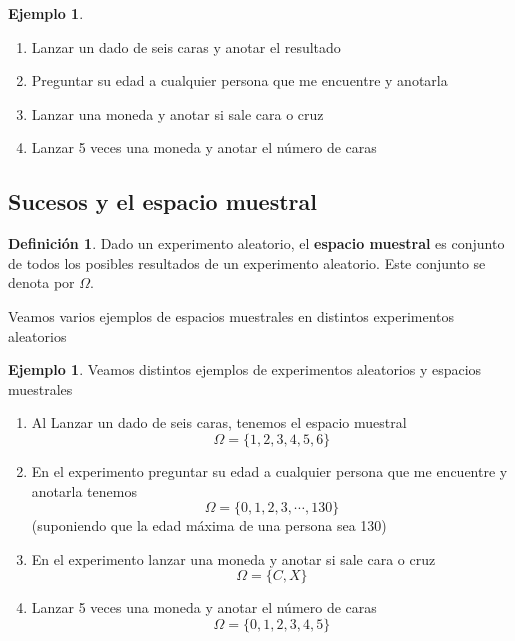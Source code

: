 \documentclass[]{book}
\theoremstyle{plain}
\theoremstyle{definition}
\newtheorem{definition}[theorem]{Definición}
\newtheorem{example}[theorem]{Ejemplo}
\theoremstyle{definition} %
\begin{document}
\begin{example}
\begin{enumerate}
    \item Lanzar un dado de seis caras y anotar el resultado
    \item Preguntar su edad a cualquier persona que me encuentre y anotarla
    \item Lanzar una moneda y anotar si sale cara o cruz
    \item Lanzar 5 veces una moneda y anotar el número de caras
\end{enumerate}
\end{example}


\subsection*{Sucesos y el espacio muestral}

\begin{definition}
   Dado un experimento aleatorio, el \textbf{espacio muestral}  es 
   conjunto de todos los posibles resultados de un experimento aleatorio. Este conjunto se denota 
   por $\Omega$.
\end{definition}
Veamos varios ejemplos de espacios muestrales en distintos experimentos aleatorios
\begin{example}
  Veamos distintos ejemplos de experimentos aleatorios y espacios muestrales
        \begin{enumerate}
            \item Al Lanzar un dado de seis caras, tenemos el espacio muestral 
            \[\Omega = \{1, 2, 3, 4, 5, 6\}\]
            \item En el experimento preguntar su edad a cualquier persona que me encuentre y anotarla tenemos
            \[\Omega = \{0,1, 2, 3,\cdots, 130\}\]
            (suponiendo que la edad máxima de una persona sea 130)
            \item En el experimento lanzar una moneda y anotar si sale cara o cruz
            \[\Omega = \{C, X\}\]
            \item Lanzar 5 veces una moneda y anotar el número de caras
            \[\Omega = \{0, 1, 2, 3, 4, 5\}\]
        \end{enumerate}
\end{example}
\end{document}

